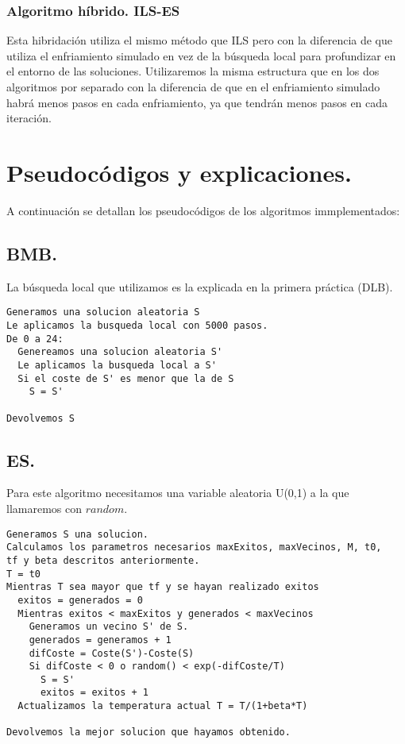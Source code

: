 \subsubsection{Algoritmo híbrido. ILS-ES}

Esta hibridación utiliza el mismo método que ILS pero con la diferencia de que utiliza el enfriamiento simulado en vez de la búsqueda local para profundizar en el entorno de las soluciones. Utilizaremos la misma estructura que en los dos algoritmos por separado con la diferencia de que en el enfriamiento simulado habrá menos pasos en cada enfriamiento, ya que tendrán menos pasos en cada iteración.

\newpage
\section{Pseudocódigos y explicaciones.}

A continuación se detallan los pseudocódigos de los algoritmos immplementados:\\

\subsection{BMB.}

La búsqueda local que utilizamos es la explicada en la primera práctica (DLB).\\


\noindent\hrulefill

\begin{lstlisting}
Generamos una solucion aleatoria S
Le aplicamos la busqueda local con 5000 pasos.
De 0 a 24:
  Genereamos una solucion aleatoria S'
  Le aplicamos la busqueda local a S'
  Si el coste de S' es menor que la de S
    S = S'
    
Devolvemos S
\end{lstlisting}

\noindent\hrulefill

\subsection{ES.}
Para este algoritmo necesitamos una variable aleatoria U(0,1) a la que llamaremos con $random$.\\

\noindent\hrulefill


\begin{lstlisting}
Generamos S una solucion.
Calculamos los parametros necesarios maxExitos, maxVecinos, M, t0, 
tf y beta descritos anteriormente.
T = t0
Mientras T sea mayor que tf y se hayan realizado exitos 
  exitos = generados = 0
  Mientras exitos < maxExitos y generados < maxVecinos
    Generamos un vecino S' de S.
    generados = generamos + 1
    difCoste = Coste(S')-Coste(S)
    Si difCoste < 0 o random() < exp(-difCoste/T)
      S = S'
      exitos = exitos + 1
  Actualizamos la temperatura actual T = T/(1+beta*T)
    
Devolvemos la mejor solucion que hayamos obtenido.
\end{lstlisting}
\noindent\hrulefill
\newpage

